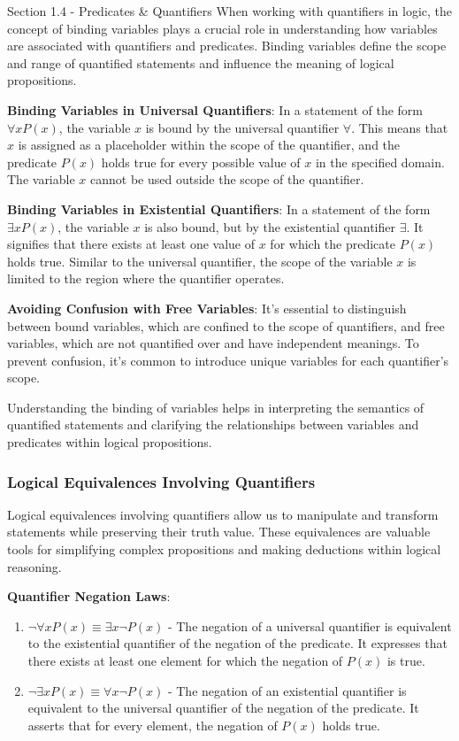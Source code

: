\begin{notes}{Section 1.4 - Predicates \& Quantifiers}
    When working with quantifiers in logic, the concept of binding variables plays a crucial role in understanding how variables are associated with quantifiers and predicates. Binding variables define the scope and range of quantified statements and influence 
    the meaning of logical propositions.
    
    \textbf{Binding Variables in Universal Quantifiers}: In a statement of the form \(\forall x P(x)\), the variable \(x\) is bound by the universal quantifier \(\forall\). This means that \(x\) is assigned as a placeholder within the scope of the quantifier, 
    and the predicate \(P(x)\) holds true for every possible value of \(x\) in the specified domain. The variable \(x\) cannot be used outside the scope of the quantifier.
    
    \textbf{Binding Variables in Existential Quantifiers}: In a statement of the form \(\exists x P(x)\), the variable \(x\) is also bound, but by the existential quantifier \(\exists\). It signifies that there exists at least one value of \(x\) for which the 
    predicate \(P(x)\) holds true. Similar to the universal quantifier, the scope of the variable \(x\) is limited to the region where the quantifier operates.
    
    \textbf{Avoiding Confusion with Free Variables}: It's essential to distinguish between bound variables, which are confined to the scope of quantifiers, and free variables, which are not quantified over and have independent meanings. To prevent confusion, 
    it's common to introduce unique variables for each quantifier's scope.
    
    Understanding the binding of variables helps in interpreting the semantics of quantified statements and clarifying the relationships between variables and predicates within logical propositions.
    
    \subsubsection*{Logical Equivalences Involving Quantifiers}

    Logical equivalences involving quantifiers allow us to manipulate and transform statements while preserving their truth value. These equivalences are valuable tools for simplifying complex propositions and making deductions within logical reasoning.
    
    \textbf{Quantifier Negation Laws}:
    \begin{enumerate}
        \item \(\neg \forall x P(x) \equiv \exists x \neg P(x)\) - The negation of a universal quantifier is equivalent to the existential quantifier of the negation of the predicate. It expresses that there exists at least one element for which the negation 
        of \(P(x)\) is true.
        \item \(\neg \exists x P(x) \equiv \forall x \neg P(x)\) - The negation of an existential quantifier is equivalent to the universal quantifier of the negation of the predicate. It asserts that for every element, the negation of \(P(x)\) holds true.
    \end{enumerate}
    

\end{notes}
